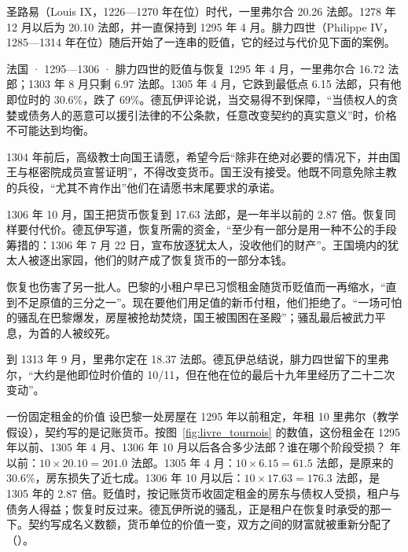 
圣路易（Louis IX，1226—1270 年在位）时代，一里弗尔合 20.26 法郎。1278 年 12 月以后为 20.10 法郎，并一直保持到 1295 年 4 月。腓力四世（Philippe IV，1285—1314 年在位）随后开始了一连串的贬值，它的经过与代价见下面的案例。

\begin{case}{法国 · 1295—1306 · 腓力四世的贬值与恢复}
1295 年 4 月，一里弗尔合 16.72 法郎；1303 年 8 月只剩 6.97 法郎\cite{wailly1857}。1305 年 4 月，它跌到最低点 6.15 法郎，只有他即位时的 30.6\%，跌了 69\%。德瓦伊评论说，当交易得不到保障，“当债权人的贪婪或债务人的恶意可以援引法律的不公条款，任意改变契约的真实意义”时，价格不可能达到均衡\cite{wailly1857}。

1304 年前后，高级教士向国王请愿，希望今后“除非在绝对必要的情况下，并由国王与枢密院成员宣誓证明”，不得改变货币。国王没有接受。他既不同意免除主教的兵役，“尤其不肯作出”他们在请愿书末尾要求的承诺\cite{wailly1857}。

1306 年 10 月，国王把货币恢复到 17.63 法郎，是一年半以前的 2.87 倍。恢复同样要付代价。德瓦伊写道，恢复所需的资金，“至少有一部分是用一种不公的手段筹措的：1306 年 7 月 22 日，宣布放逐犹太人，没收他们的财产”\cite{wailly1857}。王国境内的犹太人被逐出家园，他们的财产成了恢复货币的一部分本钱。

恢复也伤害了另一批人。巴黎的小租户早已习惯租金随货币贬值而一再缩水，“直到不足原值的三分之一”。现在要他们用足值的新币付租，他们拒绝了。“一场可怕的骚乱在巴黎爆发，房屋被抢劫焚烧，国王被围困在圣殿”\cite{wailly1857}；骚乱最后被武力平息，为首的人被绞死\cite{wailly1857}。

到 1313 年 9 月，里弗尔定在 18.37 法郎。德瓦伊总结说，腓力四世留下的里弗尔，“大约是他即位时价值的 10/11，但在他在位的最后十九年里经历了二十二次变动”\cite{wailly1857}。
\end{case}

\begin{example}{一份固定租金的价值}\label{ex:medieval-rent}
设巴黎一处房屋在 1295 年以前租定，年租 10 里弗尔（教学假设），契约写的是记账货币。按图~\ref{fig:livre_tournois} 的数值，这份租金在 1295 年以前、1305 年 4 月、1306 年 10 月以后各合多少法郎？谁在哪个阶段受损？
 年以前：$10\times20.10=201.0$ 法郎。1305 年 4 月：$10\times6.15=61.5$ 法郎，是原来的 30.6\%，房东损失了近七成。1306 年 10 月以后：$10\times17.63=176.3$ 法郎，是 1305 年的 2.87 倍。贬值时，按记账货币收固定租金的房东与债权人受损，租户与债务人得益；恢复时反过来。德瓦伊所说的骚乱，正是租户在恢复时承受的那一下。契约写成名义数额，货币单位的价值一变，双方之间的财富就被重新分配了（）。
\end{example}

